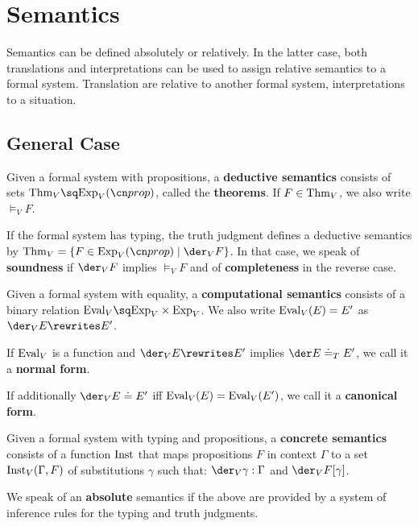 \section{Semantics}

Semantics can be defined absolutely or relatively.
In the latter case, both translations and interpretations can be used to assign relative semantics to a formal system.
Translation are relative to another formal system, interpretations to a situation.

\subsection{General Case}

\begin{definition}
Given a formal system with propositions, a \textbf{deductive semantics} consists of sets $\Thm_V\sq \Exp_V(\prop)$, called the \textbf{theorems}.
If $F\in\mathrm{Thm}_V$, we also write $\models_V F$.

If the formal system has typing, the truth judgment defines a deductive semantics by $\Thm_V=\{F\in\Exp_V(\prop)\;|\;\der_V F\}$.
In that case, we speak of \textbf{soundness} if $\der_V F$ implies $\models_V F$ and of \textbf{completeness} in the reverse case.
\end{definition}

\begin{definition}
Given a formal system with equality, a \textbf{computational semantics} consists of a binary relation $\Eval_V\sq\Exp_V\times\Exp_V$.
We also write $\mathrm{Eval}_V(E)=E'$ as $\der_V E\rewrites E'$.

If $\mathrm{Eval}_V$ is a function and $\der_V E\rewrites E'$ implies $\der E\doteq_T E'$, we call it a \textbf{normal form}.

If additionally $\der_V E\doteq E'$ iff $\mathrm{Eval}_V(E)=\mathrm{Eval}_V(E')$, we call it a \textbf{canonical form}.
\end{definition}

\begin{definition}
Given a formal system with typing and propositions, a \textbf{concrete semantics} consists of a function $\mathrm{Inst}$ that maps propositions $F$ in context $\Gamma$ to a set  $\mathrm{Inst}_V(\Gamma,F)$ of substitutions $\gamma$ such that: $\der_V \gamma:\Gamma$ and $\der_V F[\gamma]$.
\end{definition}

We speak of an \textbf{absolute} semantics if the above are provided by a system of inference rules for the typing and truth judgments.


